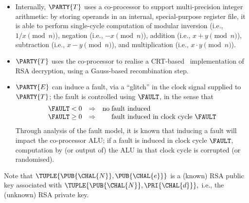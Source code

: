 \begin{itemize}
\item Internally, 
      $\PARTY{T}$ 
      uses a co-processor to support multi-precision integer arithmetic: by
      storing operands in an internal, special-purpose register file, it is
      able to perform single-cycle computation of modular
           inversion (i.e., $1 / x     \pmod{n}$),
            negation (i.e., $  - x     \pmod{n}$),
            addition (i.e., $x +     y \pmod{n}$),
         subtraction (i.e., $x -     y \pmod{n}$),
      and
      multiplication (i.e., $x \cdot y \pmod{n}$).
\item $\PARTY{T}$ 
      uses the co-processor to realise a CRT-based~\cite{SCALE:QuiCou:82} 
      implementation of RSA decryption, using a Gauss-based recombination 
      step.
\item $\PARTY{E}$
      can induce a fault, via a ``glitch'' in the clock signal supplied to
      $\PARTY{T}$;
      the fault is controlled using $\FAULT$, in the sense that
      \[
      \begin{array}{c@{\;}c@{\;}c c c@{\;}l}
      \FAULT &<   & 0 &\Rightarrow& \mbox{no} & \mbox{fault induced                        } \\
      \FAULT &\geq& 0 &\Rightarrow&           & \mbox{fault induced in clock cycle $\FAULT$} \\
      \end{array}
      \]
      Through analysis of the fault model, it is known that inducing a fault 
      will impact the co-processor ALU; if a fault is induced in clock cycle
      $\FAULT$, computation by (or output of) the ALU in that clock cycle is
      corrupted (or randomised).
\end{itemize}


%
Note that
$
\TUPLE{ \PUB{\CHAL{N}}, \PUB{\CHAL{e}} }
$
is
a     (known) RSA public  key 
associated with 
$
\TUPLE{ \PUB{\CHAL{N}}, \PRI{\CHAL{d}} } ,
$
i.e.,
the (unknown) RSA private key.


